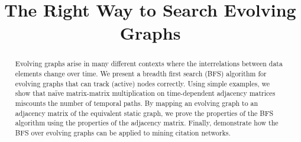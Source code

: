 \documentclass[10pt,conference,compsocconf]{IEEEtran}
\theoremstyle{definition}
\begin{document}
%
\title{The Right Way to Search Evolving Graphs}


\author{
\and
{}
}

\maketitle

\begin{abstract}
Evolving graphs arise in many different contexts where the
interrelations between data elements change over time.
We present a breadth first search (BFS) algorithm for evolving graphs
that can track (active) nodes correctly.
Using simple examples, we show that na\"ive matrix-matrix multiplication on
time-dependent adjacency matrices miscounts the number of temporal paths.
By mapping an evolving graph to an adjacency matrix of the equivalent static graph,
we prove the properties of the BFS algorithm using the properties of the
adjacency matrix. Finally, demonstrate how the BFS over evolving graphs can be
applied to mining citation networks.

\end{abstract}
\end{document}
